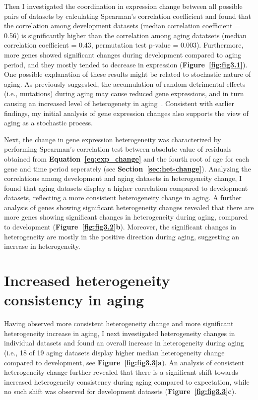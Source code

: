 Then I investigated the coordination in expression change between all possible pairs of datasets by calculating Spearman's correlation coefficient 
and found that the correlation among development datasets (median correlation coefficient = 0.56) 
is significantly higher than the correlation among aging datatsets (median correlation coefficient = 0.43, permutation test p-value = 0.003).
Furthermore, more genes showed significant changes during development compared to aging period, and they mostly tended to decrease in expression (\textbf{Figure~\ref{fig:fig3.1}}).
One possible explanation of these results might be related to stochastic nature of aging. 
As previously suggested, the accumulation of random detrimental effects (i.e., mutations) during aging may cause reduced gene expressions, 
and in turn causing an increased level of heterogenety in aging~\cite{Lu2004}.
Consistent with earlier findings, my initial analysis of gene expression changes also supports the view of aging as a stochastic process.

Next, the change in gene expression heterogeneity was characterized 
by performing Spearman's correlation test between absolute value of residuals obtained from \textbf{Equation~\ref{eq:exp_change}} 
and the fourth root of age for each gene and time period seperately (see \textbf{Section~\ref{sec:het-change}}).
Analyzing the correlations among development and aging datasets in heterogeneity change,
I found that aging datasets display a higher correlation compared to development datasets, 
reflecting a more consistent heterogeneity change in aging.
A further analysis of genes showing significant heterogeneity changes revealed that 
there are more genes showing significant changes in heterogeneity during aging, compared to development (\textbf{Figure~\ref{fig:fig3.2}b}). 
Moreover, the significant changes in heterogeneity are mostly in the positive direction during aging, suggesting an increase in heterogeneity.

\section{Increased heterogeneity consistency in aging}
Having observed more consistent heterogeneity change and more significant heterogeneity increase in aging, 
I next investigated heterogeneity changes in individual datasets and found an overall increase in heterogeneity during aging 
(i.e., 18 of 19 aging datasets display higher median heterogeneity change compared to development, see \textbf{Figure~\ref{fig:fig3.3}a}). 
An analysis of consistent heterogeneity change further revealed that there is a significant shift towards increased heterogeneity consistency during aging compared to expectation,
while no such shift was observed for development datasets (\textbf{Figure~\ref{fig:fig3.3}c}).


